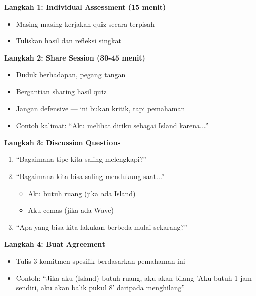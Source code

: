 \begin{exercisebox}
\textbf{Langkah 1: Individual Assessment (15 menit)}
\begin{itemize}
    \item Masing-masing kerjakan quiz secara terpisah
    \item Tuliskan hasil dan refleksi singkat
\end{itemize}

\textbf{Langkah 2: Share Session (30-45 menit)}
\begin{itemize}
    \item Duduk berhadapan, pegang tangan
    \item Bergantian sharing hasil quiz
    \item Jangan defensive --- ini bukan kritik, tapi pemahaman
    \item Contoh kalimat: ``Aku melihat diriku sebagai Island karena...''
\end{itemize}

\textbf{Langkah 3: Discussion Questions}
\begin{enumerate}
    \item ``Bagaimana tipe kita saling melengkapi?''
    \item ``Bagaimana kita bisa saling mendukung saat...''
    \begin{itemize}
        \item Aku butuh ruang (jika ada Island)
        \item Aku cemas (jika ada Wave)
    \end{itemize}
    \item ``Apa yang bisa kita lakukan berbeda mulai sekarang?''
\end{enumerate}

\textbf{Langkah 4: Buat Agreement}
\begin{itemize}
    \item Tulis 3 komitmen spesifik berdasarkan pemahaman ini
    \item Contoh: ``Jika aku (Island) butuh ruang, aku akan bilang 'Aku butuh 1 jam sendiri, aku akan balik pukul 8' daripada menghilang''
\end{itemize}
\end{exercisebox}
